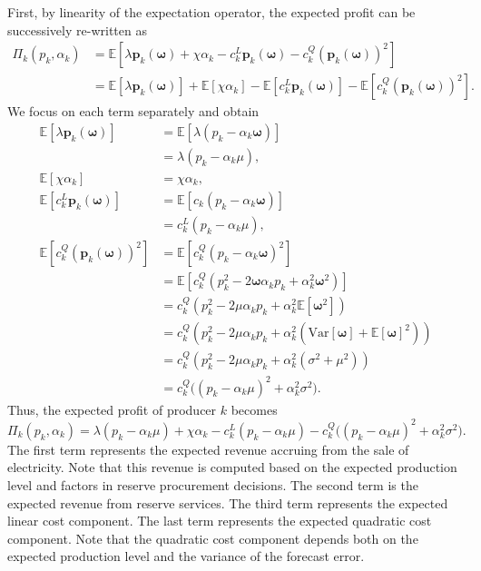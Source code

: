 \documentclass{article}
\begin{document}
First, by linearity of the expectation operator, the expected profit can be successively re-written as
\begin{align*}
\Pi_k(p_k, \alpha_k) &= \mathbb{E}[\lambda \mathbf{p}_k(\boldsymbol{\omega}) + \chi \alpha_k - c_k^L \mathbf{p}_k(\boldsymbol{\omega}) - c_k^Q (\mathbf{p}_k(\boldsymbol{\omega}))^2]\\
&= \mathbb{E}[\lambda \mathbf{p}_k(\boldsymbol{\omega})] + \mathbb{E}[\chi \alpha_k] - \mathbb{E}[c_k^L \mathbf{p}_k(\boldsymbol{\omega})] - \mathbb{E}[c_k^Q (\mathbf{p}_k(\boldsymbol{\omega}))^2].
\end{align*}
We focus on each term separately and obtain
\begin{align*}
\mathbb{E}[\lambda \mathbf{p}_k(\boldsymbol{\omega})] &= \mathbb{E}[\lambda (p_k - \alpha_k \boldsymbol{\omega})]\\
& = \lambda (p_k - \alpha_k \mu),\\
\mathbb{E}[\chi \alpha_k] &= \chi \alpha_k,\\
\mathbb{E}[c_k^L \mathbf{p}_k(\boldsymbol{\omega})] &= \mathbb{E}[c_k (p_k - \alpha_k \boldsymbol{\omega})]\\
&= c_k^L(p_k - \alpha_k \mu),\\
\mathbb{E}[c_k^Q (\mathbf{p}_k(\boldsymbol{\omega}))^2] &= \mathbb{E}[c_k^Q (p_k - \alpha_k \boldsymbol{\omega})^2]\\
&= \mathbb{E}[c_k^Q (p_k^2 - 2 \boldsymbol{\omega} \alpha_k p_k + \alpha_k^2 \boldsymbol{\omega}^2)]\\
&= c_k^Q (p_k^2 - 2\mu \alpha_k p_k + \alpha_k^2 \mathbb{E}[\boldsymbol{\omega}^2])\\
&= c_k^Q (p_k^2 - 2\mu \alpha_k p_k + \alpha_k^2 (\mbox{Var}[\boldsymbol{\omega}] + \mathbb{E}[\boldsymbol{\omega}]^2))\\
&= c_k^Q (p_k^2 - 2\mu \alpha_k p_k + \alpha_k^2 (\sigma^2 + \mu^2))\\
&= c_k^Q \big((p_k - \alpha_k \mu)^2 + \alpha_k^2 \sigma^2\big).
\end{align*}
Thus, the expected profit of producer $k$ becomes
\begin{equation*}
\Pi_k(p_k, \alpha_k) = \lambda (p_k - \alpha_k \mu) + \chi \alpha_k - c_k^L(p_k - \alpha_k \mu) - c_k^Q \big((p_k - \alpha_k \mu)^2 + \alpha_k^2 \sigma^2\big).
\end{equation*}
The first term represents the expected revenue accruing from the sale of electricity. Note that this revenue is computed based on the expected production level and factors in reserve procurement decisions. The second term is the expected revenue from reserve services. The third term represents the expected linear cost component. The last term represents the expected quadratic cost component. Note that the quadratic cost component depends both on the expected production level and the variance of the forecast error.
\end{document}
